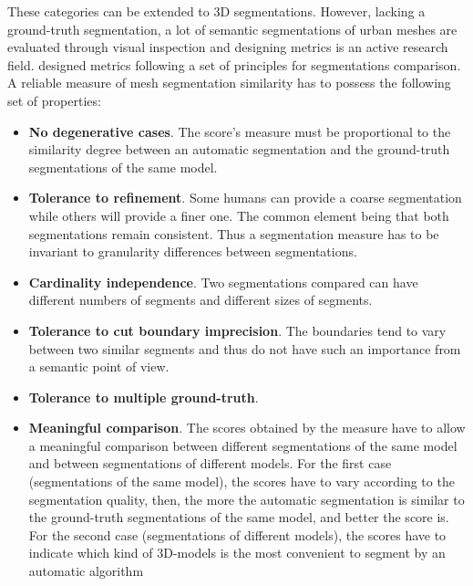 \documentclass{kththesis}
\begin{document}
These categories can be extended to 3D segmentations. However, lacking a ground-truth segmentation, a lot of semantic segmentations of urban meshes are evaluated through visual inspection and designing metrics is an active research field. \textcite{ComparativeStudyMetrics} designed metrics following a set of principles for segmentations comparison. A reliable measure of mesh segmentation similarity has to possess the following set of properties: 
\begin{itemize}
    \item \textbf{No degenerative cases}. The score’s measure must
be proportional to the similarity degree between an
automatic segmentation and the ground-truth segmentations
of the same model.
    \item \textbf{Tolerance to refinement}. Some humans can provide a coarse segmentation while others will provide a finer one. The common element being that both segmentations remain consistent. Thus a segmentation measure has to be invariant to granularity differences between segmentations.
    \item \textbf{Cardinality independence}. Two segmentations compared can have different numbers of segments
and different sizes of segments. 
    \item \textbf{Tolerance to cut boundary imprecision}. The boundaries tend to vary between two similar segments and thus do not have such an importance from a semantic point of view. 
    \item \textbf{Tolerance to multiple ground-truth}.
    \item \textbf{Meaningful comparison}. The scores obtained by
the measure have to allow a meaningful comparison
between different segmentations of the same model
and between segmentations of different models. For
the first case (segmentations of the same model),
the scores have to vary according to the segmentation
quality, then, the more the automatic segmentation
is similar to the ground-truth segmentations of the
same model, and better the score is. For the second
case (segmentations of different models), the scores
have to indicate which kind of 3D-models is the most
convenient to segment by an automatic algorithm
\end{itemize}
\end{document}

